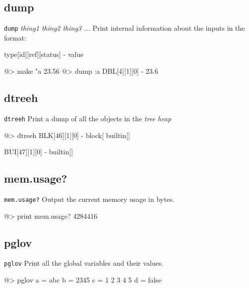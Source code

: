 \subsection*{dump}  
 
{\tt dump} {\it thing1 thing2 thing3 ...} 
\newline\newline 
Print internal information about the inputs in the format: \begin{verbatimtab} 
type[id][ref][status] - value
\end{verbatimtab}
\begin{verbatimtab} 
@> make "a 23.56
@> dump :a
DBL[4][1][0] - 23.6
\end{verbatimtab} 

\subsection*{dtreeh}  
 
{\tt dtreeh} 
\newline\newline 
Print a dump of all the objects in the {\it tree heap}
\begin{verbatimtab} 
@> dtreeh
BLK[46][1][0] - 
{block}[
{builtin}[]

BUI[47][1][0] - {builtin}[]
\end{verbatimtab} 

\subsection*{mem.usage?}  
 
{\tt mem.usage?} 
\newline\newline 
Output the current memory usage in bytes. 
\begin{verbatimtab} 
@> print mem.usage?
4284416 
\end{verbatimtab} 

\subsection*{pglov}  
 
{\tt pglov} 
\newline\newline 
Print all the global variables and their values.
\begin{verbatimtab} 
@> pglov
a = abc
b = 2345
c = 1 2 3 4 5
d = false
\end{verbatimtab} 

